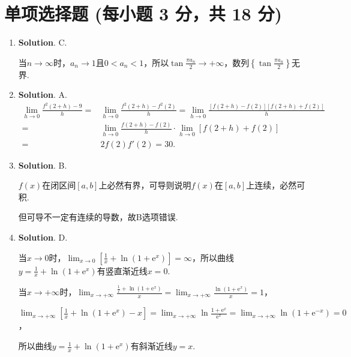 \documentclass[../Main.tex]{subfiles}
\begin{document}
\section{单项选择题 (每小题 3 分，共 18 分)}
\begin{enumerate}
    \item \textbf{Solution}. C.

          当$n\to\infty$时，$a_{n}\to1$且$0<a_{n}<1$，所以$\tan\frac{\pi a_{n}}{2}\to
              +\infty$，数列$\left\{\tan\frac{\pi a_{n}}{2}\right\}$无界.

    \item \textbf{Solution}. A.
          \[
              \begin{aligned}
                  \lim_{h\to0}\frac{f^2(2+h)-9}{h}= & \lim_{h\to0}\frac{f^2(2+h)-f^2(2)}{h}=\lim_{h\to0}\frac{\left[f(2+h)-f(2)\right]\left[f(2+h)+f(2)\right]}{h} \\
                  =                                 & \lim_{h\to0}\frac{f(2+h)-f(2)}{h}\cdot \lim_{h\to0}\left[f(2+h)+f(2)\right]                                  \\
                  =                                 & 2f(2)f'(2)=30.
              \end{aligned}
          \]

    \item \textbf{Solution}. B.

          $f(x)$在闭区间$[a,b]$上必然有界，可导则说明$f(x)$在$[a,b]$上连续，必然可积.

          但可导不一定有连续的导数，故B选项错误.

    \item \textbf{Solution}. D.

          当$x\to0$时，$\lim_{x\to0}\left[\frac{1}{x}+\ln\left(1+\mathrm{e}^{x}\right
                  )\right]=\infty$，所以曲线$y=\frac{1}{x}+\ln\left(1+\mathrm{e}^{x}\right)$有竖直渐近线$x
              =0$.

          当$x\to+\infty$时，$\lim_{x\to+\infty}\frac{\frac{1}{x}+\ln\left(1+\mathrm{e}^{x}\right)}{x}
              =\lim_{x\to+\infty}\frac{\ln\left(1+\mathrm{e}^{x}\right)}{x}=1$，

          $\lim_{x\to+\infty}\left[\frac{1}{x}+\ln\left(1+\mathrm{e}^{x}\right)-x\right
              ]=\lim_{x\to+\infty}\ln\frac{1+\mathrm{e}^{x}}{\mathrm{e}^{x}}=\lim_{x\to+\infty}
              \ln\left(1+\mathrm{e}^{-x}\right)=0$，

          所以曲线$y=\frac{1}{x}+\ln\left(1+\mathrm{e}^{x}\right)$有斜渐近线$y=x$.


\end{enumerate}
\end{document}
